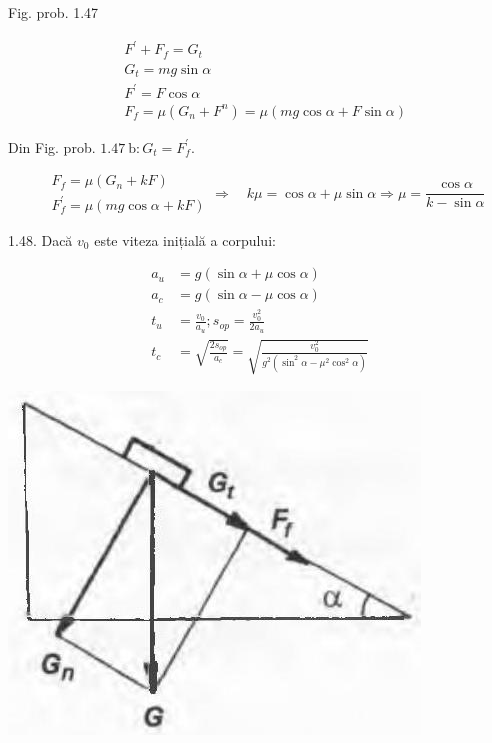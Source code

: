 \documentclass[10pt]{article}
\begin{document}
Fig. prob. 1.47

$$
\begin{aligned}
& F^{\prime}+F_{f}=G_{t} \\
& G_{t}=m g \sin \alpha \\
& F^{\prime}=F \cos \alpha \\
& F_{f}=\mu\left(G_{n}+F^{n}\right)=\mu(m g \cos \alpha+F \sin \alpha)
\end{aligned}
$$

Din Fig. prob. $1.47 \mathrm{~b}: G_{t}=F_{f}^{\prime}$.

$$
\begin{aligned}
& F_{f}=\mu\left(G_{n}+k F\right) \\
& F_{f}^{\prime}=\mu(m g \cos \alpha+k F)
\end{aligned} \Rightarrow \quad k \mu=\cos \alpha+\mu \sin \alpha \Rightarrow \mu=\frac{\cos \alpha}{k-\sin \alpha}
$$

1.48. Dacă $v_{0}$ este viteza inițială a corpului:

$$
\begin{aligned}
a_{u} & =g(\sin \alpha+\mu \cos \alpha) \\
a_{c} & =g(\sin \alpha-\mu \cos \alpha) \\
t_{u} & =\frac{v_{0}}{a_{u}} ; s_{o p}=\frac{v_{0}^{2}}{2 a_{u}} \\
t_{c} & =\sqrt{\frac{2 s_{o p}}{a_{c}}}=\sqrt{\frac{v_{0}^{2}}{g^{2}\left(\sin ^{2} \alpha-\mu^{2} \cos ^{2} \alpha\right)}}
\end{aligned}
$$

\begin{center}
\includegraphics[max width=\textwidth]{2025_07_01_5b3ff9fa0d508c8e9f17g-207(1)}
\end{center}
\end{document}
